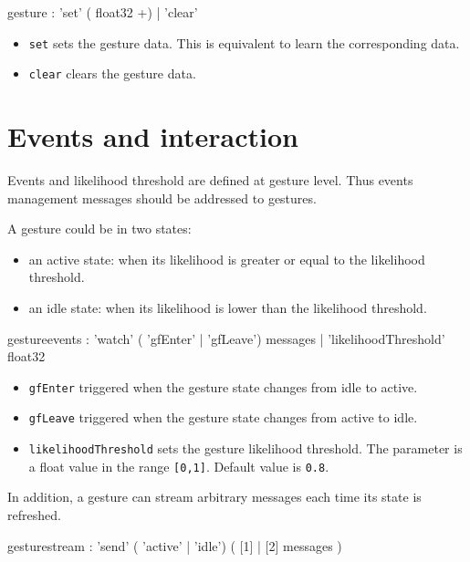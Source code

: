 \documentclass[a4paper,twoside]{report}
\newcommand{\sublevel}[1]	{\section{#1}}
\newcommand{\OSC}[1]		{\texttt{#1}}
\newcommand{\values}[1]	{\texttt{#1}}
\begin{document}
\begin{rail}
gesture : 'set' ( float32 +)
		| 'clear'
\end{rail}

\begin{itemize}
\item \OSC{set} sets the gesture data. This is equivalent to learn the corresponding data.
\item \OSC{clear} clears the gesture data. 
\end{itemize}

\sublevel{Events and interaction}\label{gfevents}

Events and likelihood threshold are defined at gesture level. Thus events management messages should be addressed to gestures. 

A gesture could be in two states:
\begin{itemize}
\item an active state: when its likelihood is greater or equal to the likelihood threshold.
\item an idle state: when its likelihood is lower than the likelihood threshold.
\end{itemize}

\begin{rail}
gestureevents :
		  	  'watch' ( 'gfEnter' | 'gfLeave') messages
		 	| 'likelihoodThreshold' float32
\end{rail}

\begin{itemize}
\item \OSC{gfEnter} triggered when the gesture state changes from idle to active.
\item \OSC{gfLeave} triggered when the gesture state changes from active to idle.
\item \OSC{likelihoodThreshold} sets the gesture likelihood threshold. The parameter is a float value in the range \values{[0,1]}. Default value is \values{0.8}.
\end{itemize}

In addition, a gesture can stream arbitrary messages each time its state is refreshed.
\begin{rail}
gesturestream :
		  	  'send' ( 'active' | 'idle') ( [1] | [2] messages )
\end{rail}
\end{document}
